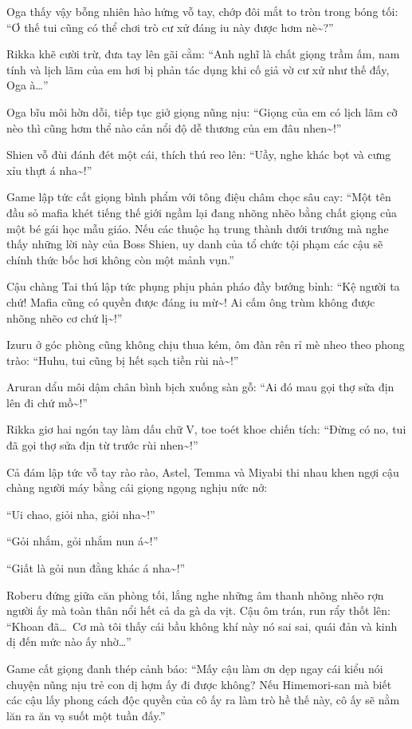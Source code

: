 \documentclass[../main.tex]{subfiles}
\begin{document}
Oga thấy vậy bỗng nhiên hào hứng vỗ tay, chớp đôi mắt to tròn trong bóng tối: ``Ơ thế tui cũng có thể chơi trò cư xử đáng iu này được hơm nè\~{}?''

Rikka khẽ cười trừ, đưa tay lên gãi cằm: ``Anh nghĩ là chất giọng trầm ấm, nam tính và lịch lãm của em hơi bị phản tác dụng khi cố giả vờ cư xử như thế đấy, Oga à\dots''

Oga bĩu môi hờn dỗi, tiếp tục giở giọng nũng nịu: ``Giọng của em có lịch lãm cỡ nèo thì cũng hơm thể nào cản nổi độ dễ thương của em đâu nhen\~{}!''

Shien vỗ đùi đánh đét một cái, thích thú reo lên: ``Uầy, nghe khác bọt và cưng xỉu thựt á nha\~{}!''

Game lập tức cất giọng bình phẩm với tông điệu châm chọc sâu cay: ``Một tên đầu sỏ mafia khét tiếng thế giới ngầm lại đang nhõng nhẽo bằng chất giọng của một bé gái học mẫu giáo. Nếu các thuộc hạ trung thành dưới trướng mà nghe thấy những lời này của Boss Shien, uy danh của tổ chức tội phạm các cậu sẽ chính thức bốc hơi không còn một mảnh vụn.''

Cậu chàng Tai thú lập tức phụng phịu phản pháo đầy bướng bỉnh: ``Kệ người ta chứ! Mafia cũng có quyền được đáng iu mừ\~{}! Ai cấm ông trùm không được nhõng nhẽo cơ chứ lị\~{}!''

Izuru ở góc phòng cũng không chịu thua kém, ôm đàn rên rỉ mè nheo theo phong trào: ``Huhu, tui cũng bị hết sạch tiền rùi nà\~{}!''

Aruran dẩu môi dậm chân bình bịch xuống sàn gỗ: ``Ai đó mau gọi thợ sửa địn lên đi chứ mồ\~{}!''

Rikka giơ hai ngón tay làm dấu chữ V, toe toét khoe chiến tích: ``Đừng có no, tui đã gọi thợ sửa địn từ trước rùi nhen\~{}!''

Cả đám lập tức vỗ tay rào rào, Astel, Temma và Miyabi thi nhau khen ngợi cậu chàng người máy bằng cái giọng ngọng nghịu nức nở:

``Ui chao, giỏi nha, giỏi nha\~{}!''

``Gỏi nhắm, gỏi nhắm nun á\~{}!''

``Giất là gỏi nun đằng khác á nha\~{}!''

Roberu đứng giữa căn phòng tối, lắng nghe những âm thanh nhõng nhẽo rợn người ấy mà toàn thân nổi hết cả da gà da vịt. Cậu ôm trán, run rẩy thốt lên: ``Khoan đã\dots\ Cơ mà tôi thấy cái bầu không khí này nó sai sai, quái đản và kinh dị đến mức nào ấy nhờ\dots''

Game cất giọng đanh thép cảnh báo: ``Mấy cậu làm ơn dẹp ngay cái kiểu nói chuyện nũng nịu trẻ con dị hợm ấy đi được không? Nếu Himemori-san mà biết các cậu lấy phong cách độc quyền của cô ấy ra làm trò hề thế này, cô ấy sẽ nằm lăn ra ăn vạ suốt một tuần đấy.''
\end{document}
